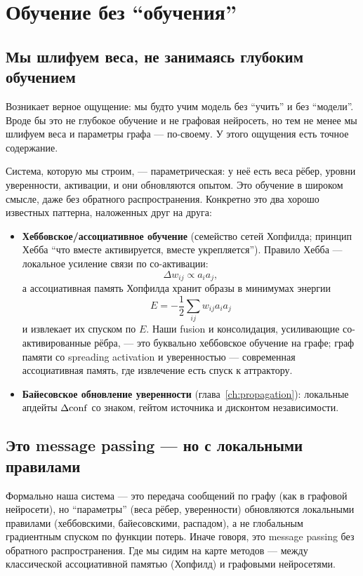 \chapter{Обучение без ``обучения''}
\label{ch:learning}

\section{Мы шлифуем веса, не занимаясь глубоким обучением}

Возникает верное ощущение: мы будто учим модель без ``учить'' и без
``модели''. Вроде бы это не глубокое обучение и не графовая нейросеть, но
тем не менее мы шлифуем веса и параметры графа --- по-своему. У этого
ощущения есть точное содержание.

Система, которую мы строим, --- параметрическая: у неё есть веса рёбер,
уровни уверенности, активации, и они обновляются опытом. Это обучение в
широком смысле, даже без обратного распространения. Конкретно это два
хорошо известных паттерна, наложенных друг на друга:

\begin{itemize}\itemsep2pt
\item \textbf{Хеббовское/ассоциативное обучение} (семейство сетей Хопфилда;
принцип Хебба ``что вместе активируется, вместе укрепляется''). Правило
Хебба --- локальное усиление связи по со-активации:
\[
\Delta w_{ij}\propto a_i a_j,
\]
а ассоциативная память Хопфилда хранит образы в минимумах энергии
\[
E=-\frac12\sum_{ij}w_{ij}a_i a_j
\]
и извлекает их спуском по $E$. Наши fusion и консолидация, усиливающие
со-активированные рёбра, --- это буквально хеббовское обучение на графе;
граф памяти со spreading activation и уверенностью --- современная
ассоциативная память, где извлечение есть спуск к аттрактору.
\item \textbf{Байесовское обновление уверенности} (глава~\ref{ch:propagation}):
локальные апдейты $\Delta\mathrm{conf}$ со знаком, гейтом источника и дисконтом
независимости.
\end{itemize}

\section{Это message passing --- но с локальными правилами}

Формально наша система --- это передача сообщений по графу (как в графовой
нейросети), но ``параметры'' (веса рёбер, уверенности) обновляются
локальными правилами (хеббовскими, байесовскими, распадом), а не глобальным
градиентным спуском по функции потерь. Иначе говоря, это message passing
без обратного распространения. Где мы сидим на карте методов --- между
классической ассоциативной памятью (Хопфилд) и графовыми нейросетями.

